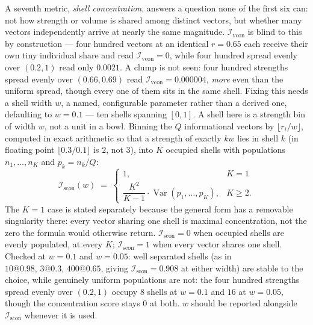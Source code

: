 \documentclass[12pt, a4paper]{article}
\begin{document}
A seventh metric, \emph{shell concentration}, answers a question none of the first six can: not
how strength or volume is shared among distinct vectors, but whether
many vectors independently arrive at nearly the same magnitude.
$\mathcal{I}_{\mathrm{vcon}}$ is blind to this by construction --- four hundred vectors at an identical $r=0.65$ each receive their own tiny individual share and read $\mathcal{I}_{\mathrm{vcon}}=0$, while four hundred spread evenly over $(0.2,1)$ read only $0.0021$. A clump is not seen: four hundred strengths spread evenly over $(0.66,0.69)$ read $\mathcal{I}_{\mathrm{vcon}}=0.000004$, \emph{more} even than the uniform spread, though every one of them sits in the same shell. Fixing this needs a shell width $w$, a named,
configurable parameter rather than a derived one, defaulting to
$w=0.1$ --- ten shells spanning $[0,1]$. A shell here is a strength bin of width $w$, not a unit in a bowl. Binning the $Q$ informational vectors by $\lfloor r_i/w\rfloor$, computed in exact arithmetic so that a strength of exactly $kw$ lies in shell $k$ (in floating point $\lfloor 0.3/0.1\rfloor$ is $2$, not $3$), into $K$ occupied shells with populations $n_1,\ldots,n_K$ and $p_k = n_k/Q$:
\begin{equation}
    \mathcal{I}_{\mathrm{scon}}(w) \;=\;
    \begin{cases}
        1, & K=1 \\[4pt]
        \dfrac{K^2}{K-1}\cdot\operatorname{Var}(p_1,\ldots,p_K), & K\ge 2.
    \end{cases}
    \label{eq:shell_concentration}
\end{equation}
The $K=1$ case is stated separately because the general form has a
removable singularity there: every vector sharing one shell is
maximal concentration, not the zero the formula would otherwise
return. $\mathcal{I}_{\mathrm{scon}}=0$ when occupied shells are evenly populated, at every $K$; $\mathcal{I}_{\mathrm{scon}}=1$ when every
vector shares one shell. Checked at $w=0.1$ and $w=0.05$: well
separated shells (as in $10@0.98,\,3@0.3,\,400@0.65$, giving
$\mathcal{I}_{\mathrm{scon}}=0.908$ at either width) are stable to the
choice, while genuinely uniform populations are not: the four hundred strengths spread evenly over $(0.2,1)$ occupy $8$ shells at $w=0.1$ and $16$ at $w=0.05$, though the concentration score stays $0$ at both. $w$ should be reported alongside
$\mathcal{I}_{\mathrm{scon}}$ whenever it is used.
\end{document}
